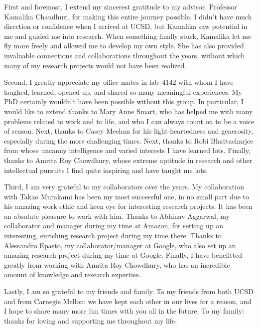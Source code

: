 \documentclass[12pt]{ucsddissertation}
\begin{document}
\begin{acknowledgements}
First and foremost, I extend my sincerest gratitude to my advisor,
Professor Kamalika Chaudhuri, for making this entire journey possible.
I didn't have much direction or confidence when I arrived at UCSD,
but Kamalika saw potential in me and guided me into research. When 
something finally stuck, Kamalika let me fly more freely and allowed me
to develop my own style. She has also provided invaluable connections and
collaborations throughout the years, without which many of my research 
projects would not have been realized.

Second, I greatly appreciate my office mates 
in lab~4142 with whom I have laughed, learned, opened up, and shared
so many meaningful experiences. My PhD certainly wouldn't have been possible without 
this group. In particular, I would like to extend thanks to
Mary Anne Smart, who has helped me with many problems related to work and to 
life, and who I can always count on to be a voice of reason. Next,
thanks to Casey Meehan for his light-heartedness and generosity,
especially during the more challenging times. Next, 
thanks to Robi Bhattacharjee from whose uncanny intelligence and varied interests
I have learned lots. Finally, thanks to Amrita Roy Chowdhury, whose
extreme aptitude in research and other intellectual pursuits I find quite
inspiring and have taught me lots.

Third, I am very grateful to my collaborators over the years. My collaboration
with Takao Murakami has been my most successful one, in no small part due to 
his amazing work ethic and keen eye for interesting research projects. It has
been an absolute pleasure to work with him. Thanks to Abhinav Aggarwal, my
collaborator and manager during my time at Amazon, for setting up an interesting,
enriching research project during my time there. Thanks to Alessandro Epasto, my 
collaborator/manager at Google, who also set up an amazing research project during my
time at Google. Finally, I have benefitted greatly from working with 
Amrita Roy Chowdhury, who has an incredible amount of knowledge and research 
expertise.

Lastly, I am so grateful to my friends and family. To my friends 
from both UCSD and from Carnegie
Mellon: we have kept each other in our lives for a reason, and I hope
to share many more fun times with you all in the future. To my family: thanks
for loving and supporting me throughout my life.



\end{acknowledgements}
\end{document}
